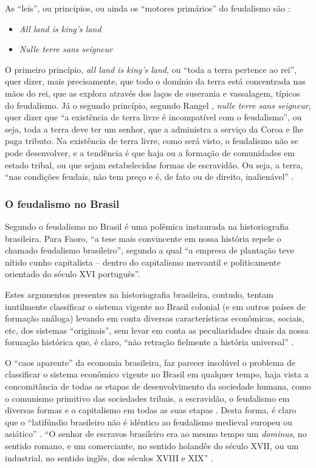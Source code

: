 \documentclass[
	12pt,				%
	oneside,			%
	a4paper,			%
	chapter=TITLE,		%
	section=TITLE,		%
	english,			%
	brazil				%
	]{abntex2}
\begin{document}
\begin{refsection}
As ``leis'', ou princípios, ou ainda os ``motores primários'' do feudalismo são
\autocite[126]{rangel1985}:
\begin{itemize}
\tightlist
\item
  \emph{All land is king's land}
\item
  \emph{Nulle terre sans seigneur}
\end{itemize}
O primeiro princípio, \emph{all land is king's land}, ou ``toda a terra pertence ao
rei'', quer dizer, mais precisamente, que todo o domínio da terra está
concentrada nas mãos do rei, que as explora através dos laços de suserania e
vassalagem, típicos do feudalismo. Já o segundo princípio, segundo Rangel
\autocite*[219]{rangel1961}, \emph{nulle terre sans seigneur}, quer dizer que ``a existência
de terra livre é incompatível com o feudalismo'', ou seja, toda a terra deve ter
um senhor, que a administra a serviço da Coroa e lhe paga tributo. Na existência
de terra livre, como será visto, o feudalismo não se pode desenvolver, e a
tendência é que haja ou a formação de comunidades em estado tribal, ou que sejam
estabelecidas formas de escravidão. Ou seja, a terra, ``nas condições feudais,
não tem preço e é, de fato ou de direito, inalienável'' \autocite[206]{rangel1960}.

\hypertarget{o-feudalismo-no-brasil}{%
\subsubsection{O feudalismo no Brasil}\label{o-feudalismo-no-brasil}}

Segundo \textcite[p.~155]{faoro} o feudalismo no Brasil é uma polêmica instaurada na
historiografia brasileira. Para Faoro, ``a tese mais convincente em nossa
história repele o chamado feudalismo brasileiro'', segundo a qual ``a empresa de
plantação teve nítido cunho capitalista -- dentro do capitalismo mercantil e
politicamente orientado do século XVI português''.

Estes argumentos presentes na historiografia brasileira, contudo, tentam
inutilmente classificar o sistema vigente no Brasil colonial (e em outros países
de formação análoga) levando em conta diversas características econômicas,
sociais, etc, dos sistemas ``originais'', sem levar em conta as peculiaridades
duais da nossa formação histórica que, é claro, ``não retração fielmente a
história universal'' \autocite[p.~296]{dualidade-basica}.

O ``caos aparente'' da economia brasileira, faz parecer insolúvel o problema de
classificar o sistema econômico vigente no Brasil em qualquer tempo, haja vista
a concomitância de todas as etapas de desenvolvimento da sociedade humana, como
o comunismo primitivo das sociedades tribais, a escravidão, o feudalismo em
diversas formas e o capitalismo em todas as suas etapas \autocite[p.
293]{dualidade-basica}. Desta forma, é claro que o ``latifúndio brasileiro não é idêntico ao
feudalismo medieval europeu ou asiático'' \autocite[p.~293]{dualidade-basica}. ``O senhor
de escravos brasileiro era ao mesmo tempo um \emph{dominus}, no sentido romano, e um
comerciante, no sentido holandês do século XVII, ou um industrial, no sentido
inglês, dos séculos XVIII e XIX'' \autocite[p.~297]{dualidade-basica}.


\end{refsection}
\end{document}
